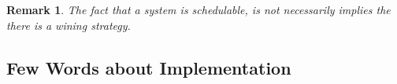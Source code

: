 \documentclass[ twoside, 12pt ]{article}
\newtheorem{remark}{Remark}
\begin{document}
\begin{remark}
    The fact that a system is schedulable, is not necessarily implies the there is a wining strategy.
\end{remark}







\subsection{Few Words about Implementation}


\end{document}
